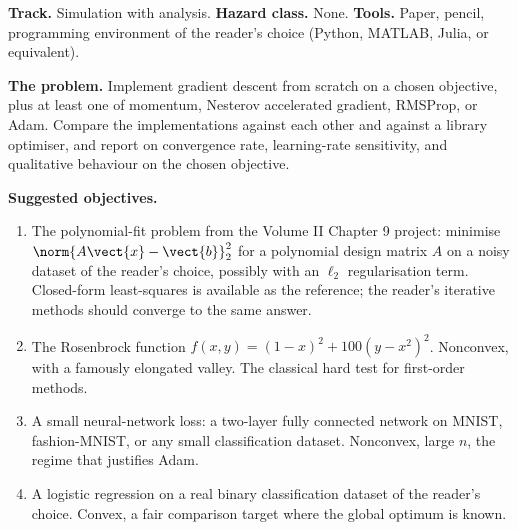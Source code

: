 \begin{project}

\textbf{Track.} Simulation with analysis. \textbf{Hazard class.}
None. \textbf{Tools.} Paper, pencil, programming environment of
the reader's choice (Python, MATLAB, Julia, or equivalent).

\textbf{The problem.} Implement gradient descent from scratch on
a chosen objective, plus at least one of momentum, Nesterov
accelerated gradient, RMSProp, or Adam. Compare the
implementations against each other and against a library
optimiser, and report on convergence rate, learning-rate
sensitivity, and qualitative behaviour on the chosen objective.

\textbf{Suggested objectives.}
\begin{enumerate}[leftmargin=*]
  \item The polynomial-fit problem from the Volume II Chapter 9
    project: minimise $\norm{A \vect{x} - \vect{b}}_{2}^{2}$ for
    a polynomial design matrix $A$ on a noisy dataset of the
    reader's choice, possibly with an $\ell_{2}$ regularisation
    term. Closed-form least-squares is available as the
    reference; the reader's iterative methods should converge to
    the same answer.
  \item The Rosenbrock function $f(x, y) = (1 - x)^{2} + 100
    (y - x^{2})^{2}$. Nonconvex, with a famously elongated
    valley. The classical hard test for first-order methods.
  \item A small neural-network loss: a two-layer fully connected
    network on MNIST, fashion-MNIST, or any small classification
    dataset. Nonconvex, large $n$, the regime that justifies
    Adam.
  \item A logistic regression on a real binary classification
    dataset of the reader's choice. Convex, a fair comparison
    target where the global optimum is known.
\end{enumerate}


\end{project}
